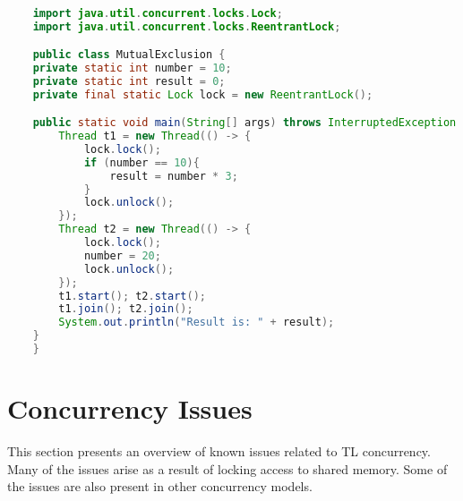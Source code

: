 \begin{lstlisting}[float,label=lst:mutualexclusion,
  caption={Mutual exclusion in Java using a lock},
  language=Java,  
  showspaces=false,
  showtabs=false,
  breaklines=true,
  showstringspaces=false,
  breakatwhitespace=true,
  commentstyle=\color{greencomments},
  keywordstyle=\color{bluekeywords},
  stringstyle=\color{redstrings}]  % Start your code-block

	import java.util.concurrent.locks.Lock;
	import java.util.concurrent.locks.ReentrantLock;

	public class MutualExclusion {
    private static int number = 10;
    private static int result = 0;
    private final static Lock lock = new ReentrantLock();

    public static void main(String[] args) throws InterruptedException {
        Thread t1 = new Thread(() -> {
            lock.lock();
            if (number == 10){
                result = number * 3;
            }
            lock.unlock();
        });
        Thread t2 = new Thread(() -> {
            lock.lock();
            number = 20;
            lock.unlock();
        });
        t1.start(); t2.start();
        t1.join(); t2.join();
        System.out.println("Result is: " + result);
    }
	}
\end{lstlisting}


\section{Concurrency Issues}\label{sec:tl_ci}
This section presents an overview of known issues related to \ac{TL} concurrency. Many of the issues arise as a result of locking access to shared memory. Some of the issues are also present in other concurrency models.
 
